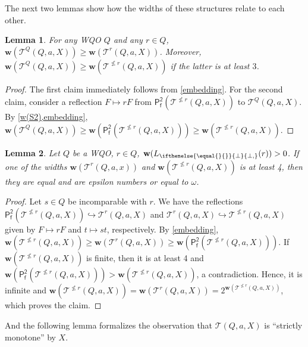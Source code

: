 \documentclass[10pt,a4paper]{amsart}
\let \nleq \nleqslant
\let \geq \geqslant
\let \embeds \hookrightarrow
\newcommand \K [2][]{L_{\ifthenelse{\equal{#1}{}}{\bot}{\bot,#1}}(#2)}
\renewcommand \k [2][]{\w(\K[#1]{#2})}
\renewcommand \S [1][]{\mathsf{P_f^{#1}}}
\def \T {\mathcal{T}}
\def \w {\textbf{w}}
\newtheorem{lemma}{Lemma}
\begin{document}
The next two lemmas show how the widths of these structures relate to each other.


\begin{lemma}\label{restrict the root}
    For any WQO $Q$ and any $r \in Q$, $\w(\T^Q(Q, a, X)) \geq \w(\T^r(Q, a, X))$. Moreover, $\w(\T^Q(Q, a, X)) \geq \w(\T^{\nleq r}(Q, a, X))$ if the latter is at least $3$.
\end{lemma}
\begin{proof}
    The first claim immediately follows from \cref{embedding}. For the second claim, consider a reflection $F \mapsto rF$ from $\S[2](\T^{\nleq r}(Q, a, X))$ to $\T^Q(Q, a, X)$. By \cref{w(S2),embedding}, $\w(\T^Q(Q, a, X)) \geq \w(\S[2](\T^{\nleq r}(Q, a, X))) \geq \w(\T^{\nleq r}(Q, a, X))$.
\end{proof}

\begin{lemma}\label{w(T) is epsilon}
    Let $Q$ be a WQO, $r \in Q$, $\k{r} > 0$. If one of the widths $\w(\T^r(Q, a, x))$ and $\w(\T^{\nleq r}(Q, a, X))$ is at least 4, then they are equal and are epsilon numbers or equal to $\omega$.
\end{lemma}
\begin{proof}
    Let $s \in Q$ be incomparable with $r$. We have the reflections $\S[2](\T^{\nleq r}(Q, a, X)) \embeds \T^r(Q, a, X)$ and $\T^r(Q, a, X) \embeds \T^{\nleq r}(Q, a, X)$ given by $F \mapsto rF$ and $t \mapsto st$, respectively. By \cref{embedding}, $\w(\T^{\nleq r}(Q, a, X)) \geq \w(\T^r(Q, a, X)) \geq \w(\S[2](\T^{\nleq r}(Q, a, X)))$. If $\w(\T^{\nleq r}(Q, a, X))$ is finite, then it is at least 4 and $\w(\S[2](\T^{\nleq r}(Q, a, X))) > \w(\T^{\nleq r}(Q, a, X))$, a contradiction. Hence, it is infinite and $\w(\T^{\nleq r}(Q, a, X)) = \w(\T^r(Q, a, X)) =2^{\w(\T^{\nleq r}(Q, a, X))}$, which proves the claim.
\end{proof}

And the following lemma formalizes the observation that $\T(Q, a, X)$ is ``strictly monotone'' by $X$.
\end{document}
